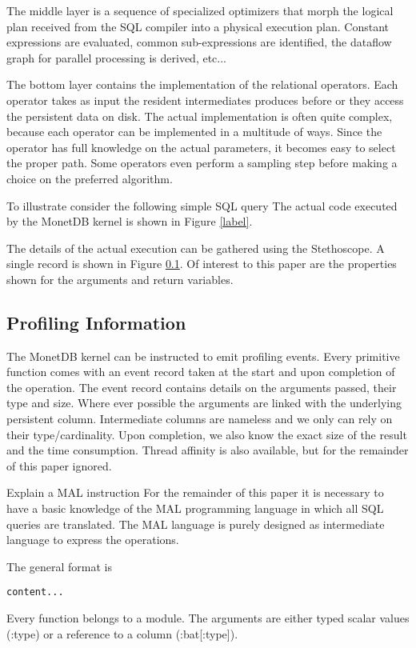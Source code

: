 The middle layer is a sequence of specialized optimizers that morph the logical
plan received from the SQL compiler into a physical execution plan.
Constant expressions are evaluated, common sub-expressions are identified,
the dataflow graph for parallel processing is derived, etc...

The bottom layer contains the implementation of the relational operators.
Each operator takes as input the resident intermediates produces before
or they access the persistent data on disk.
The actual implementation is often quite complex,
because each operator can be implemented in a multitude of ways.
Since the operator has full knowledge on the actual parameters,
it becomes easy to select the proper path.
Some operators even perform a sampling step before making a choice on the
 preferred algorithm.

To illustrate consider the following simple SQL query
The actual code executed by the MonetDB kernel is shown in Figure \ref{label}.

The details of the actual execution can be gathered using the Stethoscope.
A single record is shown in Figure \ref{}. Of interest to this paper are
the properties shown for the arguments and return variables.

\subsection{Profiling Information}
The MonetDB kernel can be instructed to emit profiling events.
Every primitive function comes with an event record taken at the start and
upon completion of the operation. The event record contains details on the
arguments passed, their type and size. Where ever possible the arguments
are linked with the underlying persistent column. Intermediate columns are
nameless and we only can rely on their type/cardinality.
Upon completion, we also know the exact size of the result and the time consumption.
Thread affinity is also available, but for the remainder of this paper ignored.

Explain a MAL instruction
For the remainder of this paper it is necessary to have a basic knowledge of the
MAL programming language in which all SQL queries are translated.
The MAL language is purely designed as intermediate language to express the operations.

The general format is
\begin{verbatim}
content...
\end{verbatim}
Every function belongs to a module. The arguments are either typed scalar
values (:type) or a reference to a column (:bat[:type]).
